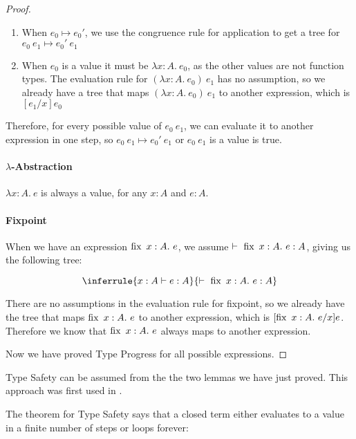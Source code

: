 \begin{proof}
\begin{enumerate}
\item{When $e_0 \mapsto e_0'$, we use the congruence rule for application to get a tree for $e_0 \ e_1 \mapsto e_0' \ e_1$}
\item{When $e_0$ is a value it must be $\lambda x:A. \  e_0$, as the other values are not function types. The evaluation rule for $(\lambda x:A. \ e_0 ) \ e_1$ has no assumption, so we already have a tree that maps $(\lambda x:A. \ e_0 ) \ e_1$ to another expression, which is $[e_1/x]e_0$}
\end{enumerate}

Therefore, for every possible value of $e_0 \ e_1$, we can evaluate it to another expression in one step, so $e_0 \ e_1 \mapsto e_0' \  e_1$ or $e_0 \ e_1$ is a value is true. 

\paragraph{$\lambda$-Abstraction} $\lambda x:A. \ e$ is always a value, for any $x:A$ and $e : A$.

\paragraph{Fixpoint} When we have an expression $\fix \ x:A. \ e$, we assume $\vdash \ \operatorname{fix} \ x:A. \ e : A$, giving us the following tree:

$$
\inferrule {x : A \vdash e : A }
  { \vdash \  \fix \ x:A . \ e : A}
$$

There are no assumptions in the evaluation rule for fixpoint, so we already have the tree that maps $\fix \ x:A. \ e$ to another expression, which is  $[\operatorname{fix} \ x:A. \ e/x]e$. Therefore we know that $\fix \ x:A. \ e$ always maps to another expression. %

Now we have proved Type Progress for all possible expressions.
\end{proof}

Type Safety can be  assumed from the the two lemmas we have just proved. This approach was first used in \citep{Wright94}. 


The theorem for Type Safety says that a closed term either evaluates to a value in a finite number of steps or loops forever:

\vspace{0.5cm}

